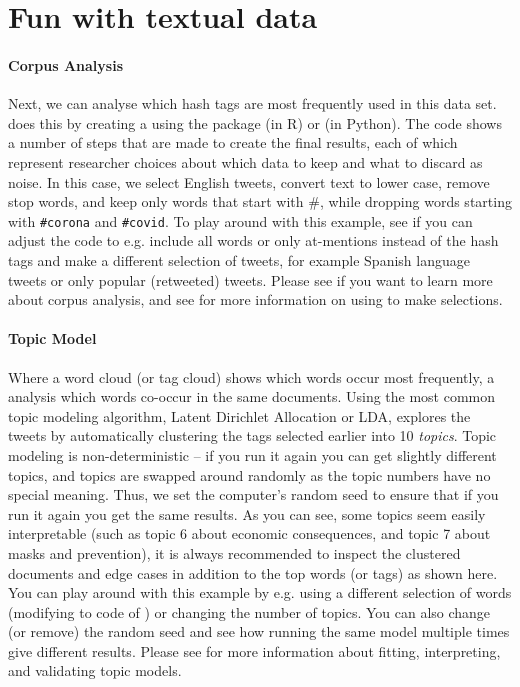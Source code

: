 
\section{Fun with textual data}

\paragraph{Corpus Analysis} Next, we can analyse which hash tags are most frequently used in this data set.
 does this by creating a  using the package  (in R)
or \sklearn (in Python).
The code shows a number of steps that are made to create the final results, each of which represent
researcher choices about which data to keep and what to discard as noise.
In this case,  we select English tweets, convert text to lower case, remove stop words, and keep only words that start with \#,
while dropping words starting with \verb+#corona+ and \verb+#covid+.
To play around with this example,
see if you can adjust the code to e.g. include all words or only at-mentions instead of the hash tags
and make a different selection of tweets, for example Spanish language tweets or only popular (retweeted) tweets.
Please see  if you want to learn more about corpus analysis,
and see  for more information on using  to make selections. 


\paragraph{Topic Model}
Where a word cloud (or tag cloud) shows which words occur most frequently,
a  analysis which words co-occur in the same documents.
Using the most common topic modeling algorithm, Latent Dirichlet Allocation or LDA,
 explores the tweets by automatically clustering the tags selected earlier into 10 \emph{topics}.
Topic modeling is non-deterministic -- if you run it again you can get slightly different topics,
and topics are swapped around randomly as the topic numbers have no special meaning.
Thus, we set the computer's random seed to ensure that if you run it again you get the same results.
As you can see, some topics seem easily interpretable (such as topic 6 about economic consequences,
and topic 7 about masks and prevention), it is always recommended to inspect the clustered documents
and edge cases in addition to the top words (or tags) as shown here.
You can play around with this example by e.g. using a different selection of words
(modifying to code of ) or changing the number of topics.
You can also change (or remove) the random seed and see how running the same model multiple times give different results. 
Please see  for more information about fitting, interpreting, and validating topic models.

